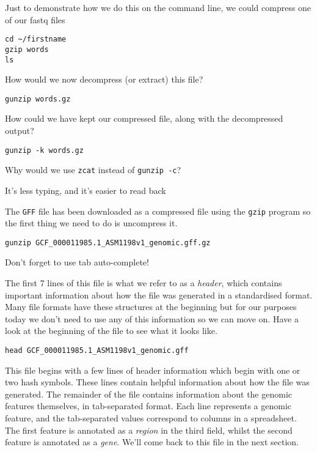 \begin{steps}
Just to demonstrate how we do this on the command line, we could compress one of our fastq files
\begin{lstlisting}
cd ~/firstname
gzip words
ls
\end{lstlisting}
\end{steps}

\begin{questions}
How would we now decompress (or extract) this file?\\
\begin{answer}
\texttt{gunzip words.gz}\\
\end{answer}

How could we have kept our compressed file, along with the decompressed output?\\
\begin{answer}
\texttt{gunzip -k words.gz}\\
\end{answer}

Why would we use \texttt{zcat} instead of \texttt{gunzip -c}?\\
\begin{answer}
It's less typing, and it's easier to read back
\end{answer}
\end{questions}


\begin{steps}
The \texttt{GFF} file has been downloaded as a compressed file using the \texttt{gzip} program so the first thing we need to do is uncompress it.
\begin{lstlisting}
gunzip GCF_000011985.1_ASM1198v1_genomic.gff.gz
\end{lstlisting}
Don't forget to use tab auto-complete!
\end{steps}


\begin{steps}
The first 7 lines of this file is what we refer to as a \textit{header}, which contains important information about how the file was generated in a standardised format.
Many file formats have these structures at the beginning but for our purposes today we don't need to use any of this information so we can move on.
Have a look at the beginning of the file to see what it looks like.
\end{steps}
\begin{lstlisting}
head GCF_000011985.1_ASM1198v1_genomic.gff
\end{lstlisting}

This file begins with a few lines of header information which begin with one or two hash symbols.
These lines contain helpful information about how the file was generated.
The remainder of the file contains information about the genomic features themselves, in tab-separated format.
Each line represents a genomic feature, and the tab-separated values correspond to columns in a spreadsheet.
The first feature is annotated as a \textit{region} in the third field, whilst the second feature is annotated as a \textit{gene}.
We'll come back to this file in the next section.

